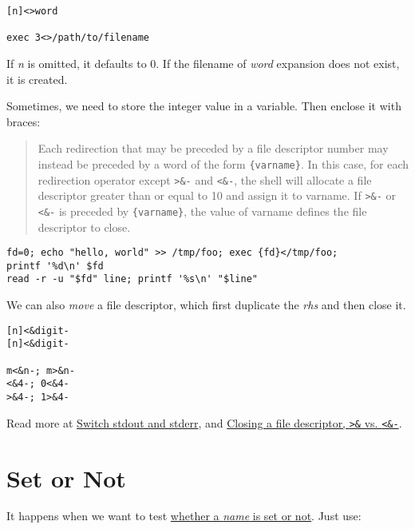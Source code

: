 \begin{lstlisting}
[n]<>word

exec 3<>/path/to/filename
\end{lstlisting}

If \textit{n} is omitted, it defaults to 0. If the filename of
\textit{word} expansion does not exist, it is created.

Sometimes, we need to store the integer value in a variable. Then
enclose it with braces:

\begin{quotation}
  Each redirection that may be preceded by a file descriptor
  number may instead be preceded by a word of the form
  \verb|{varname}|. In this case, for each redirection operator
  except \verb|>&-| and \verb|<&-|, the shell will allocate a file
  descriptor greater than or equal to 10 and assign it to varname.
  If \verb|>&-| or \verb|<&-| is preceded by \verb|{varname}|, the
  value of varname defines the file descriptor to close.
\end{quotation}

\begin{minipage}{1.0\linewidth}
\begin{lstlisting}
fd=0; echo "hello, world" >> /tmp/foo; exec {fd}</tmp/foo;
printf '%d\n' $fd
read -r -u "$fd" line; printf '%s\n' "$line"
\end{lstlisting}
\end{minipage}

We can also \textit{move} a file descriptor, which first duplicate
the \textit{rhs} and then close it.

\begin{lstlisting}
[n]<&digit-
[n]<&digit-

m<&n-; m>&n-
<&4-; 0<&4-
>&4-; 1>&4-
\end{lstlisting}

Read more at \href{https://unix.stackexchange.com/q/42728}{Switch
  stdout and stderr},
 and
\href{https://unix.stackexchange.com/q/131801}{Closing a file
  descriptor, \texttt{>\&} vs. \texttt{<\&-}}.

\section{Set or Not}
\label{sec:set-or-not}

It happens when we want to test
\href{https://stackoverflow.com/a/13221491}{whether a \textit{name}
  is set or not}. Just use:

